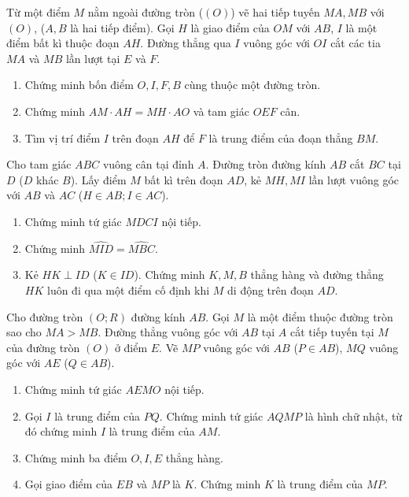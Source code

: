 \documentclass[%
    fontsize=12pt,%
    chapterprefix=false,%
    open=right,%
    twoside=false,%
    numbers=noenddot,%
    headings=optiontohead,%
    final,%
    DIV=15,%
    parskip=half %
]{scrbook}
\begin{document}
\begin{tuluan}
\item Từ một điểm $M$ nằm ngoài đường tròn ($(O)$) vẽ hai tiếp tuyến $MA, MB$ với $(O)$, ($A, B$ là hai tiếp điểm). Gọi $H$ là giao điểm của $OM$ với $AB$, $I$ là một điểm bất kì thuộc đoạn $AH$. Đường thẳng qua $I$ vuông góc với $OI$ cắt các tia $MA$ và $MB$ lần lượt tại $E$ và $F$.
\begin{enumerate}[label=\alph*)]
  \item[a)] Chứng minh bốn điểm $O, I, F, B$ cùng thuộc một đường tròn.
  \item[b)] Chứng minh $AM \cdot AH = MH \cdot AO$ và tam giác $OEF$ cân.
  \item[c)] Tìm vị trí điểm $I$ trên đoạn $AH$ để $F$ là trung điểm của đoạn thẳng $BM$.
\end{enumerate}

\item Cho tam giác $ABC$ vuông cân tại đỉnh $A$. Đường tròn đường kính $AB$ cắt $BC$ tại $D$ ($D$ khác $B$). Lấy điểm $M$ bất kì trên đoạn $AD$, kẻ $MH, MI$ lần lượt vuông góc với $AB$ và $AC$ ($H \in AB; I \in AC$).
\begin{enumerate}[label=\alph*)]
  \item[a)] Chứng minh tứ giác $MDCI$ nội tiếp.
  \item[b)] Chứng minh $\widehat{MID} = \widehat{MBC}$.
  \item[c)] Kẻ $HK \perp ID$ ($K \in ID$). Chứng minh $K, M, B$ thẳng hàng và đường thẳng $HK$ luôn đi qua một điểm cố định khi $M$ di động trên đoạn $AD$.
\end{enumerate}

\item Cho đường tròn $(O; R)$ đường kính $AB$. Gọi $M$ là một điểm thuộc đường tròn sao cho $MA > MB$. Đường thẳng vuông góc với $AB$ tại $A$ cắt tiếp tuyến tại $M$ của đường tròn $(O)$ ở điểm $E$. Vẽ $MP$ vuông góc với $AB$ ($P \in AB$), $MQ$ vuông góc với $AE$ ($Q \in AB$).
\begin{enumerate}[label=\alph*)]
  \item[a)] Chứng minh tứ giác $AEMO$ nội tiếp.
  \item[b)] Gọi $I$ là trung điểm của $PQ$. Chứng minh tứ giác $AQMP$ là hình chữ nhật, từ đó chứng minh $I$ là trung điểm của $AM$.
  \item[c)] Chứng minh ba điểm $O, I, E$ thẳng hàng.
  \item[d)] Gọi giao điểm của $EB$ và $MP$ là $K$. Chứng minh $K$ là trung điểm của $MP$.
\end{enumerate}


\end{tuluan}
\end{document}
